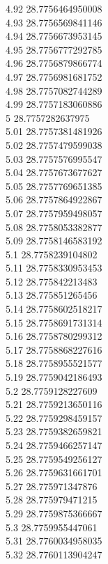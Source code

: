 {4.92	28.7756464950008\\
4.93	28.7756569841146\\
4.94	28.7756673953145\\
4.95	28.7756777292785\\
4.96	28.7756879866774\\
4.97	28.7756981681752\\
4.98	28.7757082744289\\
4.99	28.7757183060886\\
5	28.7757282637975\\
5.01	28.7757381481926\\
5.02	28.7757479599038\\
5.03	28.7757576995547\\
5.04	28.7757673677627\\
5.05	28.7757769651385\\
5.06	28.7757864922867\\
5.07	28.7757959498057\\
5.08	28.7758053382877\\
5.09	28.7758146583192\\
5.1	28.7758239104802\\
5.11	28.7758330953453\\
5.12	28.775842213483\\
5.13	28.775851265456\\
5.14	28.7758602518217\\
5.15	28.7758691731314\\
5.16	28.7758780299312\\
5.17	28.7758868227616\\
5.18	28.7758955521577\\
5.19	28.7759042186493\\
5.2	28.7759128227609\\
5.21	28.7759213650116\\
5.22	28.7759298459157\\
5.23	28.7759382659821\\
5.24	28.7759466257147\\
5.25	28.7759549256127\\
5.26	28.7759631661701\\
5.27	28.775971347876\\
5.28	28.775979471215\\
5.29	28.7759875366667\\
5.3	28.7759955447061\\
5.31	28.7760034958035\\
5.32	28.7760113904247\\
}
